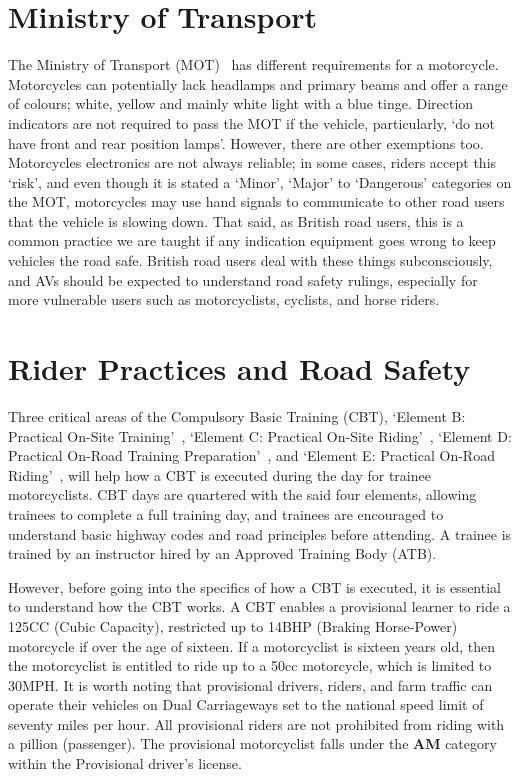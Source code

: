 \documentclass[12pt]{report} %
\begin{document}
	\section{Ministry of Transport}
		The Ministry of Transport (MOT)~\cite{govuk_mot_nodate} has different requirements for a motorcycle. Motorcycles can potentially lack headlamps and primary beams and offer a range of colours; white, yellow and mainly white light with a blue tinge. Direction indicators are not required to pass the MOT if the vehicle, particularly, `do not have front and rear position lamps'. However, there are other exemptions too. Motorcycles electronics are not always reliable; in some cases, riders accept this `risk', and even though it is stated a `Minor', `Major' to `Dangerous' categories on the MOT, motorcycles may use hand signals to communicate to other road users that the vehicle is slowing down. That said, as British road users, this is a common practice we are taught if any indication equipment goes wrong to keep vehicles the road safe. British road users deal with these things subconsciously, and AVs should be expected to understand road safety rulings, especially for more vulnerable users such as motorcyclists, cyclists, and horse riders.

	\section{Rider Practices and Road Safety}
	\label{sec:lcRiderPracticesRoadSafety}
		Three critical areas of the Compulsory Basic Training (CBT), `Element B: Practical On-Site Training'~\cite{govuk_compulsory_2016}, `Element C: Practical On-Site Riding'~\cite{govuk_compulsory_2016-1}, `Element D: Practical On-Road Training Preparation'~\cite{govuk_compulsory_2016-2}, and `Element E: Practical On-Road Riding'~\cite{govuk_compulsory_2016-3}, will help how a CBT is executed during the day for trainee motorcyclists. CBT days are quartered with the said four elements, allowing trainees to complete a full training day, and trainees are encouraged to understand basic highway codes and road principles before attending. A trainee is trained by an instructor hired by an Approved Training Body (ATB).
			
		However, before going into the specifics of how a CBT is executed, it is essential to understand how the CBT works. A CBT enables a provisional learner to ride a 125CC (Cubic Capacity), restricted up to 14BHP (Braking Horse-Power) motorcycle if over the age of sixteen. If a motorcyclist is sixteen years old, then the motorcyclist is entitled to ride up to a 50cc motorcycle, which is limited to 30MPH. It is worth noting that provisional drivers, riders, and farm traffic can operate their vehicles on Dual Carriageways set to the national speed limit of seventy miles per hour. All provisional riders are not prohibited from riding with a pillion (passenger). The provisional motorcyclist falls under the \textbf{AM} category within the Provisional driver's license.
		
\end{document}
